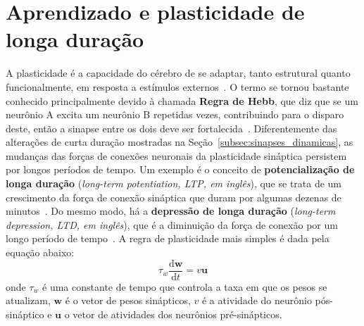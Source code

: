 \section{Aprendizado e plasticidade de longa duração}\label{sec:aprendizado}

A plasticidade é a capacidade do cérebro de se adaptar, tanto estrutural quanto funcionalmente, em resposta a estímulos externos~\cite{mateos-aparicio_impact_2019}. O termo se tornou bastante conhecido principalmente devido à chamada \textbf{Regra de Hebb}, que diz que se um neurônio A excita um neurônio B repetidas vezes, contribuindo para o disparo deste, então a sinapse entre os dois deve ser fortalecida~\cite{hebb_organization_2005}. Diferentemente das alterações de curta duração mostradas na Seção~\ref{subsec:sinapses_dinamicas}, as mudanças das forças de conexões neuronais da plasticidade sináptica persistem por longos períodos de tempo. Um exemplo é o conceito de \textbf{potencialização de longa duração} (\textit{long-term potentiation, LTP, em inglês}), que se trata de um crescimento da força de conexão sináptica que duram por algumas dezenas de minutos~\cite{bliss_longlasting_1973}. Do mesmo modo, há a \textbf{depressão de longa duração} (\textit{long-term depression, LTD, em inglês}), que é a diminuição da força de conexão por um longo período de tempo~\cite{bear_long-term_1996}. A regra de plasticidade mais simples é dada pela equação abaixo:
\begin{equation}\label{eq:regra_hebb}
	\tau_w\dfrac{\mathrm{d}\mathbf{w}}{\mathrm{d}t}=v\mathbf{u}
\end{equation}
onde $\tau_w$ é uma constante de tempo que controla a taxa em que os pesos se atualizam, $\mathbf{w}$ é o vetor de pesos sinápticos, $v$ é a atividade do neurônio pós-sináptico e $\mathbf{u}$ o vetor de atividades dos neurônios pré-sinápticos.

